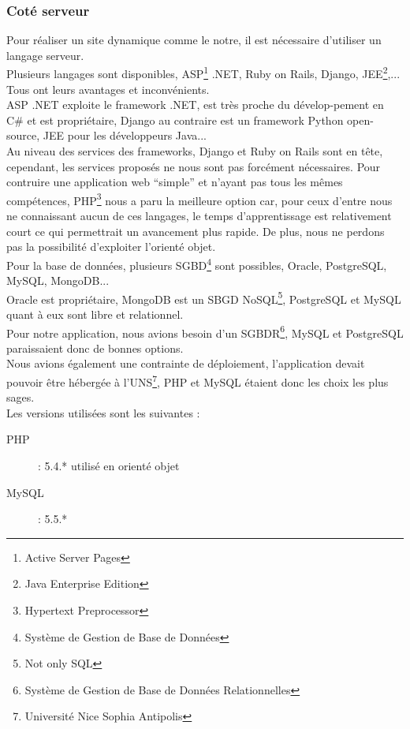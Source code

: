 \documentclass{sigplanconf}
\begin{document}
\subsubsection{Coté serveur}
Pour réaliser un site dynamique comme le notre, il est nécessaire d'utiliser un langage serveur.\\
Plusieurs langages sont disponibles, ASP\footnote{Active Server Pages} .NET, Ruby on Rails, Django, JEE\footnote{Java Enterprise Edition},... Tous ont leurs avantages et inconvénients.\\
ASP .NET exploite le framework .NET, est très proche du dévelop-pement en C\# et est propriétaire, Django au contraire est un framework Python open-source, JEE pour les développeurs Java...\\
Au niveau des services des frameworks, Django et Ruby on Rails sont en tête, cependant, les services proposés ne nous sont pas forcément nécessaires. Pour contruire une application web ``simple'' et n'ayant pas tous les mêmes compétences, PHP\footnote{Hypertext Preprocessor} nous a paru la meilleure option car, pour ceux d'entre nous ne connaissant aucun de ces langages, le temps d'apprentissage est relativement court ce qui permettrait un avancement plus rapide. De plus, nous ne perdons pas la possibilité d'exploiter l'orienté objet.\\

Pour la base de données, plusieurs SGBD\footnote{Système de Gestion de Base de Données} sont possibles, Oracle, PostgreSQL, MySQL, MongoDB...\\
Oracle est propriétaire, MongoDB est un SBGD NoSQL\footnote{Not only SQL}, PostgreSQL et MySQL quant à eux sont libre et relationnel.\\
Pour notre application, nous avions besoin d'un SGBDR\footnote{Système de Gestion de Base de Données Relationnelles}, MySQL et PostgreSQL paraissaient donc de bonnes options.\\

Nous avions également une contrainte de déploiement, l'application devait pouvoir être hébergée à l'UNS\footnote{Université Nice Sophia Antipolis}, PHP\cite{urlPHP} et MySQL\cite{urlMySQL} étaient donc les choix les plus sages.\\
Les versions utilisées sont les suivantes : 
\begin{description}
\item [PHP] : 5.4.* utilisé en orienté objet
\item [MySQL] : 5.5.*
\end{description}
\end{document}
